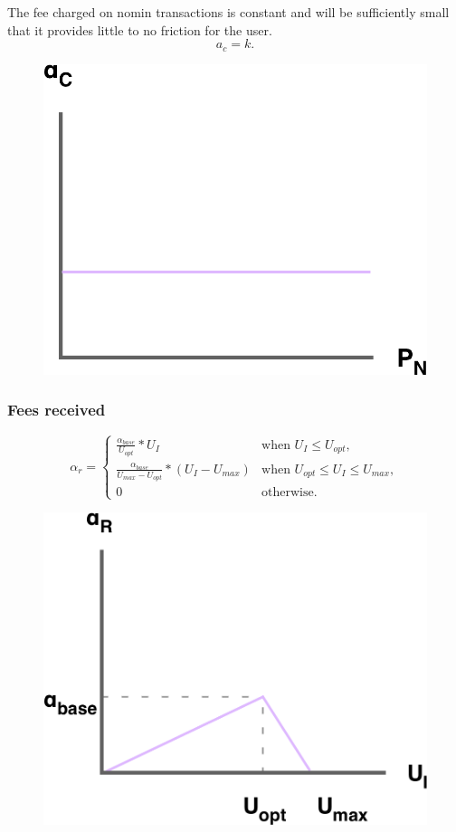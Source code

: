 \noindent The fee charged on nomin transactions is constant and will be sufficiently small that it provides little to no friction for the user. \\

$$ a_c = k.$$

\begin{figure}[h!]
    \centering
    \includegraphics[width=.55\textwidth]{img/fees-charged}
\end{figure}

\newpage
\subsubsection{Fees received}

\[
\alpha_r = 
\begin{cases}
 \frac{\alpha_{base}}{U_{opt}} * U_I &\mbox{when } U_I \leq U_{opt}, \\ 
 \frac{\alpha_{base}}{U_{max} - U_{opt}} * (U_I  - U_{max}) &\mbox{when } U_{opt} \leq U_I \leq U_{max}, \\ 
 0 &\mbox{otherwise}.
 \end{cases}
\]

\begin{figure}[h!]
    \centering
    \includegraphics[width=.55\textwidth]{img/fees-received}
\end{figure}

